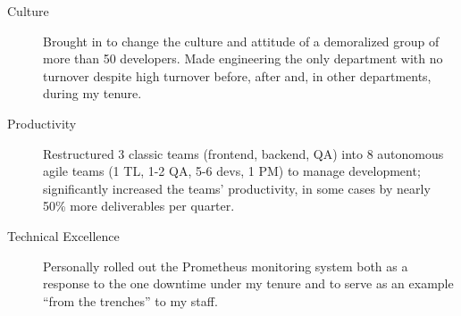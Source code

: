 \vspace{4 mm}

\begin{langen}
\begin{description}%
\item[Culture] Brought in to change the culture and attitude of a demoralized group of more than 50 developers. Made engineering the only department with no turnover despite high turnover before, after and, in other departments, during my tenure.
\item[Productivity] Restructured 3 classic teams (frontend, backend, QA) into 8 autonomous agile teams (1 TL, 1-2 QA, 5-6 devs, 1 PM) to manage development; significantly increased the teams' productivity, in some cases by nearly 50\% more deliverables per quarter.
\item[Technical Excellence] Personally rolled out the Prometheus monitoring system both as a response to the one downtime under my tenure and to serve as an example ``from the trenches'' to my staff.
\end{description}
\end{langen}



\vspace{4 mm}

